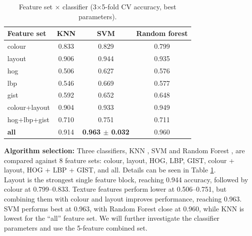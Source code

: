 \documentclass[12pt]{article}
\begin{document}
\begin{table}[H]
    \centering
    \caption{Feature set $\times$ classifier (3$\times$5-fold CV accuracy, best parameters).}
    \label{tab:feature_classifier}
    \scriptsize
    \setlength{\tabcolsep}{6pt}
    \begin{tabular}{lccc}
        \toprule
        Feature set & KNN & SVM & Random forest \\
        \midrule
        colour        & 0.833 & 0.829 & 0.799 \\
        layout        & 0.906 & 0.944 & 0.935 \\
        hog           & 0.506 & 0.627 & 0.576 \\
        lbp           & 0.546 & 0.669 & 0.577 \\
        gist          & 0.592 & 0.652 & 0.648 \\
        colour+layout & 0.904 & 0.933 & 0.949 \\
        hog+lbp+gist  & 0.710 & 0.751 & 0.711 \\
        \textbf{all}  & 0.914 & \textbf{0.963 $\pm$ 0.032} & 0.960 \\
        \bottomrule
    \end{tabular}
\end{table}
\textbf{Algorithm selection:} Three classifiers, KNN \cite{cover1967nearest}, SVM \cite{cortes1995support} and Random Forest \cite{breiman2001random}, are compared against 8 feature sets: colour, layout, HOG, LBP, GIST, colour + layout, HOG + LBP + GIST, and all. Details can be seen in Table \ref{tab:feature_classifier}.
\\
Layout is the strongest single feature block, reaching 0.944 accuracy, followed by colour at 0.799--0.833. Texture features perform lower at 0.506--0.751, but combining them with colour and layout improves performance, reaching 0.963. SVM performs best at 0.963, with Random Forest close at 0.960, while KNN is lowest for the ``all'' feature set. We will further investigate the classifier parameters and use the 5-feature combined set.
\end{document}

